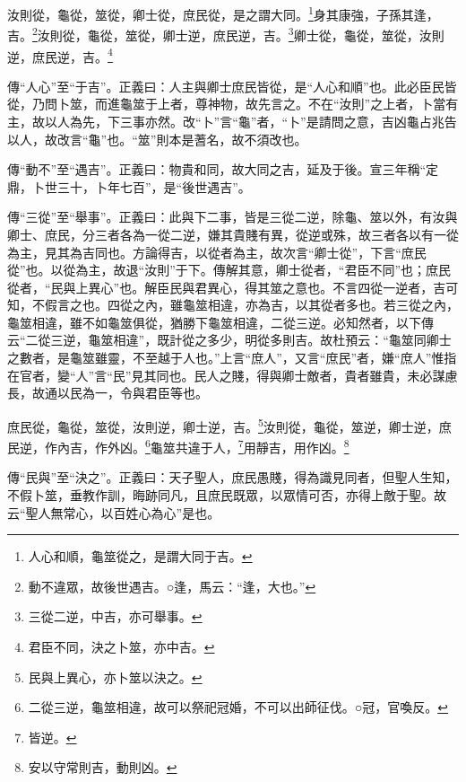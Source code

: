 汝則從，龜從，筮從，卿士從，庶民從，是之謂大同。\footnote{人心和順，龜筮從之，是謂大同于吉。}身其康強，子孫其逢，吉。\footnote{動不違眾，故後世遇吉。○逢，馬云：“逢，大也。”}汝則從，龜從，筮從，卿士逆，庶民逆，吉。\footnote{三從二逆，中吉，亦可舉事。}卿士從，龜從，筮從，汝則逆，庶民逆，吉。\footnote{君臣不同，決之卜筮，亦中吉。}


{\noindent\zhuan{}\fzbyks 傳“人心”至“于吉”。正義曰：人主與卿士庶民皆從，是“人心和順”也。此必臣民皆從，乃問卜筮，而進龜筮于上者，尊神物，故先言之。不在“汝則”之上者，卜當有主，故以人為先，下三事亦然。改“卜”言“龜”者，“卜”是請問之意，吉凶龜占兆告以人，故改言“龜”也。“筮”則本是蓍名，故不須改也。 \par}

{\noindent\zhuan{}\fzbyks 傳“動不”至“遇吉”。正義曰：物貴和同，故大同之吉，延及于後。宣三年稱“定鼎，卜世三十，卜年七百”，是“後世遇吉”。 \par}

{\noindent\zhuan{}\fzbyks 傳“三從”至“舉事”。正義曰：此與下二事，皆是三從二逆，除龜、筮以外，有汝與卿士、庶民，分三者各為一從二逆，嫌其貴賤有異，從逆或殊，故三者各以有一從為主，見其為吉同也。方論得吉，以從者為主，故次言“卿士從”，下言“庶民從”也。以從為主，故退“汝則”于下。傳解其意，卿士從者，“君臣不同”也；庶民從者，“民與上異心”也。解臣民與君異心，得其筮之意也。不言四從一逆者，吉可知，不假言之也。四從之內，雖龜筮相違，亦為吉，以其從者多也。若三從之內，龜筮相違，雖不如龜筮俱從，猶勝下龜筮相違，二從三逆。必知然者，以下傳云“二從三逆，龜筮相違”，既計從之多少，明從多則吉。故杜預云：“龜筮同卿士之數者，是龜筮雖靈，不至越于人也。”上言“庶人”，又言“庶民”者，嫌“庶人”惟指在官者，變“人”言“民”見其同也。民人之賤，得與卿士敵者，貴者雖貴，未必謀慮長，故通以民為一，令與君臣等也。 \par}

庶民從，龜從，筮從，汝則逆，卿士逆，吉。\footnote{民與上異心，亦卜筮以決之。}汝則從，龜從，筮逆，卿士逆，庶民逆，作內吉，作外凶。\footnote{二從三逆，龜筮相違，故可以祭祀冠婚，不可以出師征伐。○冠，官喚反。}龜筮共違于人，\footnote{皆逆。}用靜吉，用作凶。\footnote{安以守常則吉，動則凶。}

{\noindent\zhuan{}\fzbyks 傳“民與”至“決之”。正義曰：天子聖人，庶民愚賤，得為識見同者，但聖人生知，不假卜筮，垂教作訓，晦跡同凡，且庶民既眾，以眾情可否，亦得上敵于聖。故云“聖人無常心，以百姓心為心”是也。 \par}

